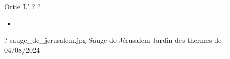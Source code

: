 \ficheidentiteplante
{Ortie}
{%
    L' 
}
{%
    ?
}
{%
    ?
}
{%
    \begin{itemize}[label = \bcplume]
        \item 
    \end{itemize}
}
{%
    ?
}
{%
    sauge_de_jerusalem.jpg
}
{%
    Sauge de Jérusalem
}
{%
    Jardin des thermes de  - 04/08/2024 
}